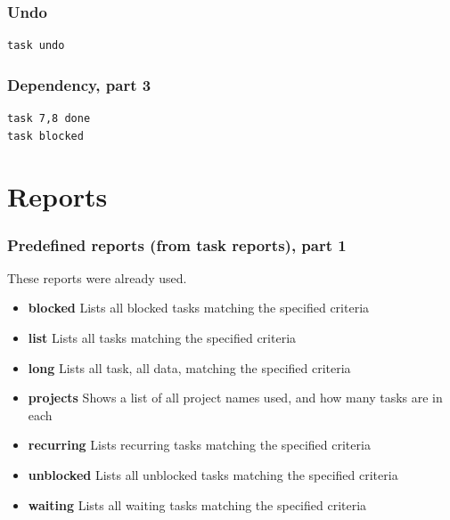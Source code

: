 \documentclass[t,handout]{beamer}
\begin{document}
\begin{frame}[fragile]\frametitle{Undo}
    \vfill
    \begin{lstlisting}
task undo
\end{lstlisting}
\end{frame}

\begin{frame}[fragile]\frametitle{Dependency, part 3}
    \vfill
    \begin{lstlisting}
task 7,8 done
task blocked
\end{lstlisting}
\end{frame}

\section{Reports}

\begin{frame}[fragile]\frametitle{Predefined reports (from task reports), part 1}
    These reports were already used.

    \begin{itemize}
        \item \textbf{blocked}          Lists all blocked tasks matching the specified criteria
        \item \textbf{list}             Lists all tasks matching the specified criteria
        \item \textbf{long}             Lists all task, all data, matching the specified criteria
        \item \textbf{projects}         Shows a list of all project names used, and how many tasks are in each
        \item \textbf{recurring}        Lists recurring tasks matching the specified criteria
        \item \textbf{unblocked}        Lists all unblocked tasks matching the specified criteria
        \item \textbf{waiting}          Lists all waiting tasks matching the specified criteria
    \end{itemize}
\end{frame}
\end{document}
